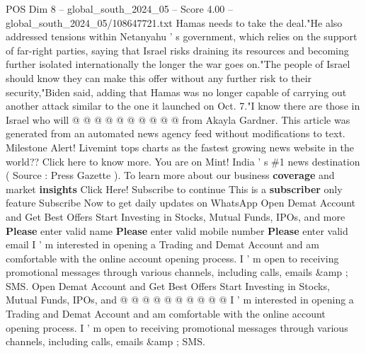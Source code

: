 \begin{textsample}{POS Dim 8 – global\_south\_2024\_05 – Score 4.00 – global\_south\_2024\_05/108647721.txt}
Hamas needs to take the deal."He also addressed tensions within Netanyahu ' s government, which relies on the support of far-right parties, saying that Israel risks draining its resources and becoming further isolated internationally the longer the war goes on."The people of Israel should know they can make this offer without any further risk to their security,"Biden said, adding that Hamas was no longer capable of carrying out another attack similar to the one it launched on Oct. 7."I know there are those in Israel who will @ @ @ @ @ @ @ @ @ @ from Akayla Gardner.
This article was generated from an automated news agency feed without modifications to text.
Milestone Alert!
Livemint tops charts as the fastest growing news website in the world??
Click here to know more.
You are on Mint!
India ' s \#1 news destination ( Source : Press Gazette ).
To learn more about our business \textbf{coverage} and market \textbf{insights} Click Here!
Subscribe to continue This is a \textbf{subscriber} only feature Subscribe Now to get daily updates on WhatsApp Open Demat Account and Get Best Offers Start Investing in Stocks, Mutual Funds, IPOs, and more \textbf{Please} enter valid name \textbf{Please} enter valid mobile number \textbf{Please} enter valid email I ' m interested in opening a Trading and Demat Account and am comfortable with the online account opening process.
I ' m open to receiving promotional messages through various channels, including calls, emails \&amp ; SMS.
Open Demat Account and Get Best Offers Start Investing in Stocks, Mutual Funds, IPOs, and @ @ @ @ @ @ @ @ @ @ I ' m interested in opening a Trading and Demat Account and am comfortable with the online account opening process.
I ' m open to receiving promotional messages through various channels, including calls, emails \&amp ; SMS.

\end{textsample}
